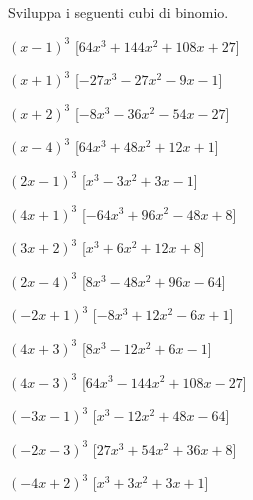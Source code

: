 \begin{esercizio}
 \label{ese:11.26}
 Sviluppa i seguenti cubi di binomio.
\begin{multicols}{2}
 \begin{enumeratea}
\spazielenx
\item \(\left(x - 1\right)^{3}\)
  \hfill [\(64 x^{3} + 144 x^{2} + 108 x + 27\)]
\item \(\left(x + 1\right)^{3}\)
  \hfill [\(- 27 x^{3} - 27 x^{2} - 9 x - 1\)]
\item \(\left(x + 2\right)^{3}\)
  \hfill [\(- 8 x^{3} - 36 x^{2} - 54 x - 27\)]
\item \(\left(x - 4\right)^{3}\)
  \hfill [\(64 x^{3} + 48 x^{2} + 12 x + 1\)]
\item \(\left(2 x - 1\right)^{3}\)
  \hfill [\(x^{3} - 3 x^{2} + 3 x - 1\)]
\item \(\left(4 x + 1\right)^{3}\)
  \hfill [\(- 64 x^{3} + 96 x^{2} - 48 x + 8\)]
\item \(\left(3 x + 2\right)^{3}\)
  \hfill [\(x^{3} + 6 x^{2} + 12 x + 8\)]
\item \(\left(2 x - 4\right)^{3}\)
  \hfill [\(8 x^{3} - 48 x^{2} + 96 x - 64\)]
\item \(\left(- 2 x + 1\right)^{3}\)
  \hfill [\(- 8 x^{3} + 12 x^{2} - 6 x + 1\)]
\item \(\left(4 x + 3\right)^{3}\)
  \hfill [\(8 x^{3} - 12 x^{2} + 6 x - 1\)]
\item \(\left(4 x - 3\right)^{3}\)
  \hfill [\(64 x^{3} - 144 x^{2} + 108 x - 27\)]
\item \(\left(- 3 x - 1\right)^{3}\)
  \hfill [\(x^{3} - 12 x^{2} + 48 x - 64\)]
\item \(\left(- 2 x - 3\right)^{3}\)
  \hfill [\(27 x^{3} + 54 x^{2} + 36 x + 8\)]
\item \(\left(- 4 x + 2\right)^{3}\)
  \hfill [\(x^{3} + 3 x^{2} + 3 x + 1\)]

\end{enumeratea}
\end{multicols}
\end{esercizio}
